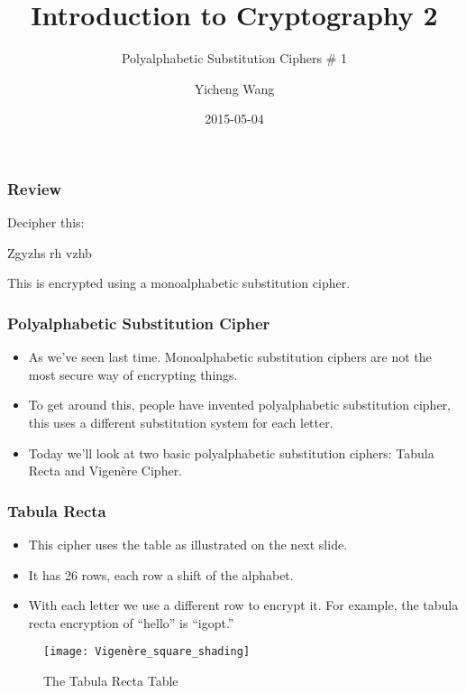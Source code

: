 \documentclass{beamer}
\title{Introduction to Cryptography 2}
\subtitle{Polyalphabetic Substitution Ciphers \# 1}
\author{Yicheng Wang}
\institute{White Hat Academy}
\date{2015-05-04}
\begin{document}
\frame{\titlepage}

\begin{frame}
    \frametitle{Review}
    Decipher this:

    \begin{center}
    Zgyzhs rh vzhb
    \end{center}

    This is encrypted using a monoalphabetic substitution cipher.
\end{frame}

\begin{frame}
    \frametitle{Polyalphabetic Substitution Cipher}
    \begin{itemize}
        \item As we've seen last time. Monoalphabetic substitution ciphers are
            not the most secure way of encrypting things.
        \item To get around this, people have invented polyalphabetic
            substitution cipher, this uses a different substitution system for
            each letter.
        \item Today we'll look at two basic polyalphabetic substitution
            ciphers: Tabula Recta and Vigenère Cipher.
    \end{itemize}
\end{frame}

\begin{frame}
    \frametitle{Tabula Recta}
    \begin{itemize}
        \item This cipher uses the table as illustrated on the next slide.
        \item It has 26 rows, each row a shift of the alphabet.
        \item With each letter we use a different row to encrypt it. For
            example, the tabula recta encryption of ``hello'' is ``igopt.''
    \end{itemize}
\end{frame}

\begin{frame}
    \begin{center}
        \begin{figure}[h]
            \texttt{[image: Vigenère\_square\_shading]}
            \caption{The Tabula Recta Table}
        \end{figure}
    \end{center}
\end{frame}
\end{document}
